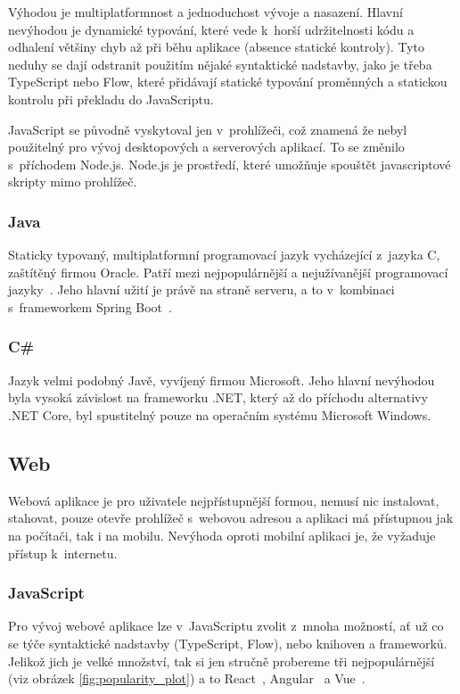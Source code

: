 Výhodou je multiplatformnost a jednoduchost vývoje a nasazení. Hlavní nevýhodou je dynamické typování, které vede k~horší udržitelnosti kódu a odhalení většiny chyb až při běhu aplikace (absence statické kontroly). Tyto neduhy se dají odstranit použitím nějaké syntaktické nadstavby, jako je třeba TypeScript nebo Flow, které přidávají statické typování proměnných a statickou kontrolu při překladu do JavaScriptu.

JavaScript se původně vyskytoval jen v~prohlížeči, což znamená že nebyl použitelný pro vývoj desktopových a serverových aplikací. To se změnilo s~příchodem Node.js. Node.js je prostředí, které umožňuje spouštět javascriptové skripty mimo prohlížeč.

\subsubsection*{Java}
Staticky typovaný, multiplatformní programovací jazyk vycházející z~jazyka C, zaštítěný firmou Oracle. Patří mezi nejpopulárnější a nejužívanější programovací jazyky~\cite{stackexchangeinc_2019_stack}. Jeho hlavní užití je právě na straně serveru, a to v~kombinaci s~frameworkem Spring Boot~\cite{jetbrainssro_2019_demographics}.

\subsubsection*{C\# }
Jazyk velmi podobný Javě, vyvíjený firmou Microsoft. Jeho hlavní nevýhodou byla vysoká závislost na frameworku .NET, který až do příchodu alternativy .NET Core, byl spustitelný pouze na operačním systému Microsoft Windows.

\subsection{Web}
\label{ss:web}
Webová aplikace je pro uživatele nejpřístupnější formou, nemusí nic instalovat, stahovat, pouze otevře prohlížeč s~webovou adresou a aplikaci má přístupnou jak na počítači, tak i na mobilu. Nevýhoda oproti mobilní aplikaci je, že vyžaduje přístup k~internetu.

\subsubsection*{JavaScript}
\label{ss:javascript}
Pro vývoj webové aplikace lze v~JavaScriptu zvolit z~mnoha možností, ať už co se týče syntaktické nadstavby (TypeScript, Flow), nebo knihoven a frameworků. Jelikož jich je velké množství, tak si jen stručně probereme tři nejpopulárnější (viz obrázek \ref{fig:popularity_plot}) a to React~\cite{facebookinc_2019_react}, Angular~\cite{googlellc_2019_angular} a Vue~\cite{you_2014_vuejs}.

